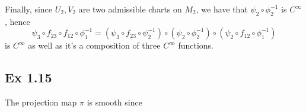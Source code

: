 \documentclass{article}
\theoremstyle{definition}
\begin{document}
Finally, since $U_2, V_2$ are two admissible charts 
on $M_2$, we have that $\psi_{2} \circ \phi_2^{-1}$ is $C^{\infty}$, hence
\[
	\psi_3 \circ f_{23} \circ f_{12} \circ \phi_1^{-1}
	=
	(\psi_3 \circ f_{23} \circ \psi_2^{-1})
	\circ
	(\psi_2 \circ \phi_2^{-1})
	\circ
	(\psi_2 \circ f_{12} \circ \phi_1^{-1})
\]
is $C^{\infty}$ as well as it's a composition of three $C^{\infty}$ functions.

\subsection*{Ex 1.15}

The projection map $\pi$ is smooth since 
\end{document}
